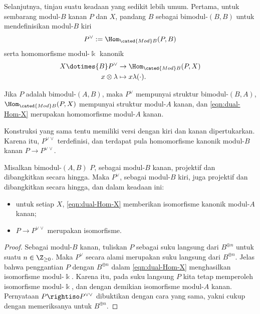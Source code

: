 Selanjutnya, tinjau suatu keadaan yang sedikit lebih umum. Pertama, untuk
sembarang modul-$B$ kanan $P$ dan $X$, pandang $B$ sebagai bimodul-$(B,B)$
untuk mendefinisikan modul-$B$ kiri
\begin{equation}\label{eqn:P-vee}
	P^\vee := \Hom_{\cated{Mod}B}(P, B)
\end{equation}
serta homomorfisme modul-$\Bbbk$ kanonik
\begin{equation}\label{eqn:dual-Hom-X}\begin{aligned}
	X \dotimes{B} P^\vee & \to \Hom_{\cated{Mod}B}(P, X) \\
	x \otimes \lambda & \mapsto x \lambda(\cdot).
\end{aligned}\end{equation}

Jika $P$ adalah bimodul-$(A,B)$, maka $P^\vee$ mempunyai struktur
bimodul-$(B,A)$, $\Hom_{\cated{Mod}B}(P,X)$ mempunyai struktur modul-$A$
kanan, dan \eqref{eqn:dual-Hom-X} merupakan homomorfisme modul-$A$ kanan.

Konstruksi yang sama tentu memiliki versi dengan kiri dan kanan dipertukarkan.
Karena itu, $P^{\vee\vee}$ terdefinisi, dan terdapat pula homomorfisme
kanonik modul-$B$ kanan $P\to P^{\vee\vee}$.

\begin{lemma}\label{prop:AB-comonad-aux}
	Misalkan bimodul-$(A,B)$ $P$, sebagai modul-$B$ kanan, projektif dan
	dibangkitkan secara hingga. Maka $P^\vee$, sebagai modul-$B$ kiri, juga
	projektif dan dibangkitkan secara hingga, dan dalam keadaan ini:
	\begin{itemize}
		\item untuk setiap $X$, \eqref{eqn:dual-Hom-X} memberikan isomorfisme
		kanonik modul-$A$ kanan;
		\item $P\to P^{\vee\vee}$ merupakan isomorfisme.
	\end{itemize}
\end{lemma}
\begin{proof}
	Sebagai modul-$B$ kanan, tuliskan $P$ sebagai suku langsung dari
	$B^{\oplus n}$ untuk suatu $n\in\Z_{\geq0}$. Maka $P^\vee$ secara alami
	merupakan suku langsung dari $B^{\oplus n}$. Jelas bahwa penggantian $P$
	dengan $B^{\oplus n}$ dalam \eqref{eqn:dual-Hom-X} menghasilkan
	isomorfisme modul-$\Bbbk$. Karena itu, pada suku langsung $P$ kita tetap
	memperoleh isomorfisme modul-$\Bbbk$, dan dengan demikian isomorfisme
	modul-$A$ kanan. Pernyataan $P\rightiso P^{\vee\vee}$ dibuktikan dengan
	cara yang sama, yakni cukup dengan memeriksanya untuk $B^{\oplus n}$.
\end{proof}

